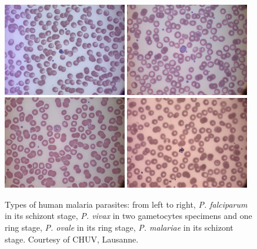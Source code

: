 \documentclass[final,a4paper,12pt,english]{UnicaPhdThesis3}
\begin{document}
\begin{figure}[h]
	\centering
	\hspace{-1.5mm}\includegraphics[width=0.48\textwidth]{images/malaria/f2_Pfalciparum}\vspace{1 mm}
	\includegraphics[width=0.48\textwidth]{images/malaria/f2_Pvivax}
	\includegraphics[width=0.48\textwidth]{images/malaria/f2_Povale}
	\includegraphics[width=0.48\textwidth]{images/malaria/f2_Pmalariae}
	\caption{\label{fig:malaria_types}Types of human malaria parasites: from left to right, \emph{P. falciparum} in its schizont stage, \emph{P. vivax} in two gametocytes specimens and one ring stage, \emph{P. ovale} in its ring stage, \emph{P. malariae} in its schizont stage.
		Courtesy of CHUV, Lausanne.}
\end{figure}
\end{document}
